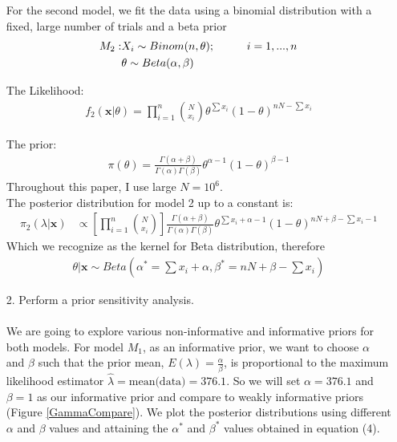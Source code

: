 \documentclass[a4paper, 9pt]{article}
\newcommand{\xbold}{ \pmb{x} }
\newcommand\tab[1][1cm]{\hspace*{#1}}
\begin{document}
\begin{enumerate}
For the second model, we fit the data using a binomial distribution with a fixed, large number of trials and a beta prior
\begin{align*}
    M_2:& X_i \sim Binom(n,\theta); \tab i=1,...,n\\
    & \theta \sim Beta(\alpha,\beta)
\end{align*}

The Likelihood:
\begin{align*}
    f_2(\pmb{x}|\theta) = \prod_{i=1}^{n} {{N}\choose{x_i}} \theta^{\sum x_i}(1 - \theta)^{nN - \sum x_i}
\end{align*}

The prior:
\begin{align*}
\pi(\theta) = \frac{\Gamma(\alpha + \beta)}{\Gamma(\alpha)\Gamma(\beta)}\theta^{\alpha - 1} (1 - \theta)^{\beta - 1}
\end{align*} 
Throughout this paper, I use large $N = 10^6$.\\
The posterior distribution for model 2 up to a constant is:
\begin{align}
    \pi_2(\lambda|\pmb{x}) &\propto \left[ \prod_{i=1}^{n} {{N}\choose{x_i}}\right]\frac{\Gamma(\alpha + \beta)}{\Gamma(\alpha)\Gamma(\beta)} \theta^{\sum x_i +  \alpha - 1} (1-\theta)^{nN + \beta - \sum x_i -  1}
\end{align}
Which we recognize as the kernel for Beta distribution, therefore
\begin{align}
    \theta|\xbold \sim Beta\left(\alpha^* = \sum x_i + \alpha, \beta^* = nN + \beta - \sum x_i\right)
\end{align}


\item[2.] Perform a prior sensitivity analysis.\\
\\
We are going to explore various non-informative and informative priors for both models. For model $M_1$, as an informative prior, we want to choose $\alpha$ and $\beta$ such that the prior mean, $E(\lambda) = \frac{\alpha}{\beta}$, is proportional to the maximum likelihood estimator $\hat\lambda = \text{mean(data)} = 376.1$. So we will set $\alpha = 376.1$ and $\beta = 1$ as our informative prior and compare to weakly informative priors (Figure \ref{GammaCompare}). We plot the posterior distributions using different $\alpha$ and $\beta$ values and attaining the $\alpha^*$ and $\beta^*$ values obtained in equation (4). 
\\\\\\


\end{enumerate}
\end{document}
